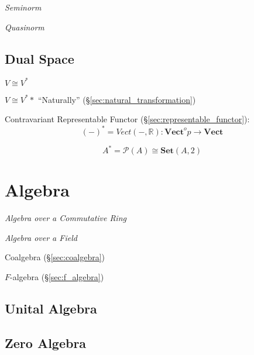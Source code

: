 \emph{Seminorm}

\emph{Quasinorm}



\subsection{Dual Space}\label{sec:dual_space}

$V \cong V^*$

$V \cong V^**$ ``Naturally'' (\S\ref{sec:natural_transformation})

Contravariant Representable Functor
(\S\ref{sec:representable_functor}):
\[
  (-)^* = Vect(-,\mathbb{R}) :
    \mathbf{Vect}^op \rightarrow \mathbf{Vect}
\]

\[
  A^* = \mathcal{P}(A) \cong \mathbf{Set}(A,2)
\]\cite{awodey06}



\section{Algebra}\label{sec:algebra}

\emph{Algebra over a Commutative Ring}

\emph{Algebra over a Field}

Coalgebra (\S\ref{sec:coalgebra})

$F$-algebra (\S\ref{sec:f_algebra})



\subsection{Unital Algebra}\label{sec:unital_algebra}

\subsection{Zero Algebra}\label{sec:zero_algebra}

